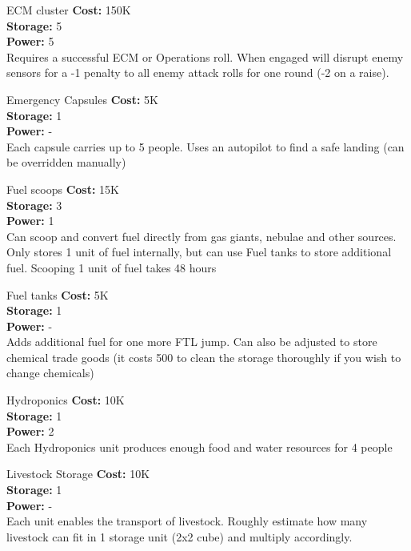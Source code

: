 \begin{multicols}{2}
\begin{genericsection}{ECM cluster}
\textbf{Cost:} 150K\\
\textbf{Storage:} 5\\
\textbf{Power:} 5\\
Requires a successful ECM or Operations roll. When engaged will disrupt enemy sensors for a -1 penalty to all enemy attack rolls for one round (-2 on a raise).
\end{genericsection}

\begin{genericsection}{Emergency Capsules}
\textbf{Cost:} 5K\\
\textbf{Storage:} 1\\
\textbf{Power:} -\\
Each capsule carries up to 5 people. Uses an autopilot to find a safe landing (can be overridden manually)
\end{genericsection}

\begin{genericsection}{Fuel scoops}
\textbf{Cost:} 15K\\
\textbf{Storage:} 3\\
\textbf{Power:} 1\\
Can scoop and convert fuel directly from gas giants, nebulae and other sources. Only stores 1 unit of fuel internally, but can use Fuel tanks to store additional fuel. Scooping 1 unit of fuel takes 48 hours
\end{genericsection}

\begin{genericsection}{Fuel tanks}
\textbf{Cost:} 5K\\
\textbf{Storage:} 1\\
\textbf{Power:} -\\
Adds additional fuel for one more FTL jump. Can also be adjusted to store chemical trade goods (it costs 500 to clean the storage thoroughly if you wish to change chemicals)\\
\end{genericsection}

\begin{genericsection}{Hydroponics}
\textbf{Cost:} 10K\\
\textbf{Storage:} 1\\
\textbf{Power:} 2\\
Each Hydroponics unit produces enough food and water resources for 4 people
\end{genericsection}

\begin{genericsection}{Livestock Storage}
\textbf{Cost:} 10K\\
\textbf{Storage:} 1\\
\textbf{Power:} -\\
Each unit enables the transport of livestock. Roughly estimate how many livestock can fit in 1 storage unit (2x2 cube) and multiply accordingly.
\end{genericsection}


\end{multicols}
